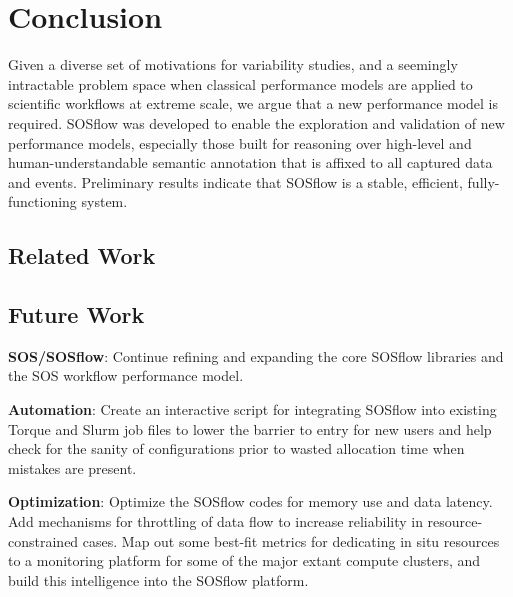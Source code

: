 
\section{Conclusion}
Given a diverse set of motivations for variability studies, and a
seemingly intractable problem space when classical performance models
are applied to scientific workflows at extreme scale, we argue that a
new performance model is required. SOSflow was developed to enable the
exploration and validation of new performance models, especially those
built for reasoning over high-level and human-understandable semantic
annotation that is affixed to all captured data and events. Preliminary
results indicate that SOSflow is a stable, efficient, fully-functioning
system.


\subsection{Related Work}




\subsection{Future Work}

\textbf{SOS/SOSflow}: Continue refining and expanding the core SOSflow
libraries and the SOS workflow performance model.

\textbf{Automation}: Create an interactive script for integrating
SOSflow into existing Torque and Slurm job files to lower the barrier
to entry for new users and help check for the sanity of configurations
prior to wasted allocation time when mistakes are present.

\textbf{Optimization}: Optimize the SOSflow codes for memory use and
data latency. Add mechanisms for throttling of data flow to increase
reliability in resource-constrained cases. Map out some best-fit
metrics for dedicating in situ resources to a monitoring platform for
some of the major extant compute clusters, and build this intelligence
into the SOSflow platform.

